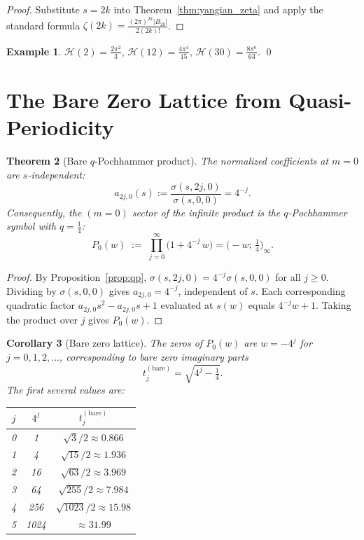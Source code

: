\documentclass[%
 aip,
 amsmath,amssymb,
 reprint,%
]{revtex4-1}
\theoremstyle{plain}
\newtheorem{theorem}{Theorem}[section]
\newtheorem{corollary}[theorem]{Corollary}
\theoremstyle{definition}
\newtheorem{example}[theorem]{Example}
\begin{document}
\begin{proof}
Substitute $s=2k$ into Theorem~\ref{thm:yangian_zeta} and apply the standard
formula $\zeta(2k)=\tfrac{(2\pi)^{2k}|B_{2k}|}{2(2k)!}$.
\end{proof}

\begin{example}
  $\mathcal{H}(2)=\tfrac{2\pi^2}{3}$,\quad
  $\mathcal{H}(12)=\tfrac{4\pi^4}{15}$,\quad
  $\mathcal{H}(30)=\tfrac{8\pi^6}{63}$. \qed
\end{example}

\section{The Bare Zero Lattice from Quasi-Periodicity}

\begin{theorem}[Bare $q$-Pochhammer product]\label{thm:bare_product}
The normalized coefficients at $m=0$ are $s$-independent:
\[
a_{2j,0}(s) := \frac{\sigma(s,2j,0)}{\sigma(s,0,0)} = 4^{-j}.
\]
Consequently, the $(m=0)$ sector of the infinite product is the $q$-Pochhammer
symbol with $q=\tfrac{1}{4}$:
\[
P_0(w) \;:=\; \prod_{j=0}^{\infty}\!\bigl(1 + 4^{-j}\,w\bigr)
= \bigl(-w;\,\tfrac{1}{4}\bigr)_\infty.
\]
\end{theorem}

\begin{proof}
By Proposition~\ref{prop:qp}, $\sigma(s,2j,0) = 4^{-j}\sigma(s,0,0)$ for all
$j\ge 0$.  Dividing by $\sigma(s,0,0)$ gives $a_{2j,0}=4^{-j}$, independent
of $s$.  Each corresponding quadratic factor $a_{2j,0}s^2 - a_{2j,0}s + 1$
evaluated at $s(w)$ equals $4^{-j}w+1$.  Taking the product over $j$ gives
$P_0(w)$.
\end{proof}

\begin{corollary}[Bare zero lattice]\label{cor:bare_zeros}
The zeros of $P_0(w)$ are $w = -4^j$ for $j=0,1,2,\ldots$, corresponding
to bare zero imaginary parts
\[
t_j^{(\mathrm{bare})} = \sqrt{4^j - \tfrac{1}{4}}.
\]
The first several values are:
\begin{center}
\begin{tabular}{ccc}
$j$ & $4^j$ & $t_j^{(\mathrm{bare})}$ \\
\hline
0 & 1     & $\sqrt{3}/2\approx 0.866$ \\
1 & 4     & $\sqrt{15}/2\approx 1.936$\\
2 & 16    & $\sqrt{63}/2\approx 3.969$\\
3 & 64    & $\sqrt{255}/2\approx 7.984$\\
4 & 256   & $\sqrt{1023}/2\approx 15.98$\\
5 & 1024  & $\approx 31.99$\\
\end{tabular}
\end{center}
\end{corollary}
\end{document}
